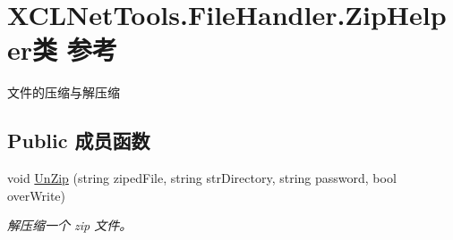 \hypertarget{class_x_c_l_net_tools_1_1_file_handler_1_1_zip_helper}{\section{X\-C\-L\-Net\-Tools.\-File\-Handler.\-Zip\-Helper类 参考}
\label{class_x_c_l_net_tools_1_1_file_handler_1_1_zip_helper}
}


文件的压缩与解压缩  


\subsection*{Public 成员函数}
\begin{DoxyCompactItemize}
\item 
void \hyperlink{class_x_c_l_net_tools_1_1_file_handler_1_1_zip_helper_abb7dfea0a9255667f2cd9dcffcd2c226}{Un\-Zip} (string ziped\-File, string str\-Directory, string password, bool over\-Write)
\begin{DoxyCompactList}\small\item\em 解压缩一个 zip 文件。 \end{DoxyCompactList}\end{DoxyCompactItemize}
